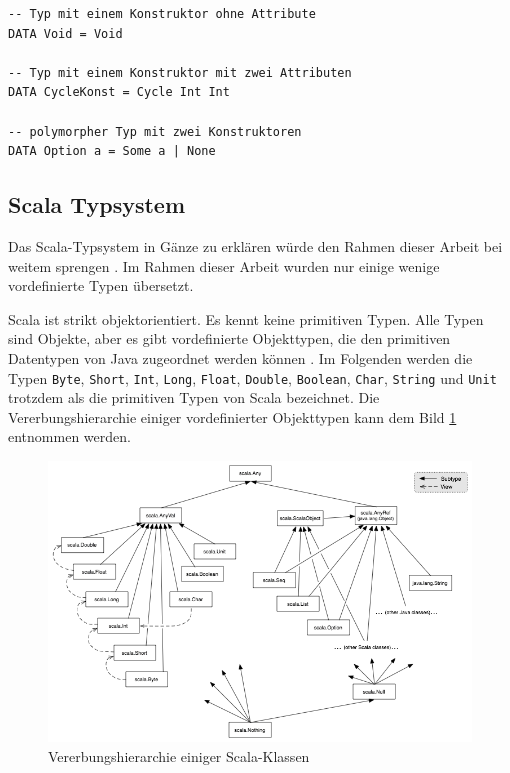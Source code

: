 \documentclass[12pt,bibtotoc]{scrreprt}
\begin{document}
\begin{lstlisting}[caption=Beispiele für selbst definierte Datentypen in \ac{SL}, label=lst:bsp2]
-- Typ mit einem Konstruktor ohne Attribute
DATA Void = Void

-- Typ mit einem Konstruktor mit zwei Attributen
DATA CycleKonst = Cycle Int Int

-- polymorpher Typ mit zwei Konstruktoren 
DATA Option a = Some a | None
\end{lstlisting}

\subsection{Scala Typsystem}

Das Scala-Typsystem in Gänze zu erklären würde den Rahmen dieser Arbeit bei weitem sprengen \cite{Odersky2013}. Im Rahmen dieser Arbeit wurden nur einige wenige vordefinierte Typen übersetzt.

Scala ist strikt objektorientiert. Es kennt keine primitiven Typen. Alle Typen sind Objekte, aber es gibt vordefinierte Objekttypen, die den primitiven Datentypen von Java zugeordnet werden können \cite{Paggen2013}. Im Folgenden werden die Typen \lstinline!Byte!, \lstinline!Short!, \lstinline!Int!, \lstinline!Long!, \lstinline!Float!, \lstinline!Double!, \lstinline!Boolean!, \lstinline!Char!, \lstinline!String! und \lstinline!Unit! trotzdem als die primitiven Typen von Scala bezeichnet. Die Vererbungshierarchie einiger vordefinierter Objekttypen kann dem Bild \ref{fig:classhierarchy} entnommen werden.

\begin{figure}[h] 
  \centering
     \includegraphics[width=\textwidth]{Bilder/classhierarchy}
  \caption{Vererbungshierarchie einiger Scala-Klassen \cite{UnbekannterAutor2013}}
  \label{fig:classhierarchy}
\end{figure}
\end{document}
